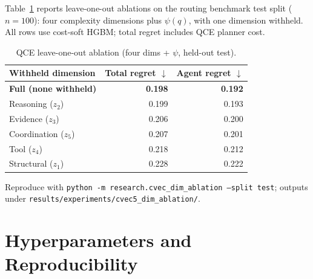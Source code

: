 Table~\ref{tab:qce-dim-loo} reports leave-one-out ablations on the routing benchmark test split
($n{=}100$): four complexity dimensions plus $\psi(q)$, with one dimension withheld.
All rows use cost-soft HGBM; total regret includes QCE planner cost.

\begin{table}[h]
  \centering
  \footnotesize
  \caption{QCE leave-one-out ablation (four dims + $\psi$, held-out test).}
  \label{tab:qce-dim-loo}
  \begin{tabular}{@{}lrr@{}}
    \toprule
    Withheld dimension & Total regret $\downarrow$ & Agent regret $\downarrow$ \\
    \midrule
    \textbf{Full (none withheld)} & \textbf{0.198} & \textbf{0.192} \\
    Reasoning ($z_2$) & 0.199 & 0.193 \\
    Evidence ($z_3$) & 0.206 & 0.200 \\
    Coordination ($z_5$) & 0.207 & 0.201 \\
    Tool ($z_4$) & 0.218 & 0.212 \\
    Structural ($z_1$) & 0.228 & 0.222 \\
    \bottomrule
  \end{tabular}
\end{table}

Reproduce with \texttt{python -m research.cvec\_dim\_ablation --split test};
outputs under \texttt{results/experiments/cvec5\_dim\_ablation/}.




\clearpage


\section{Hyperparameters and Reproducibility}
\label{app:hyperparameters}

